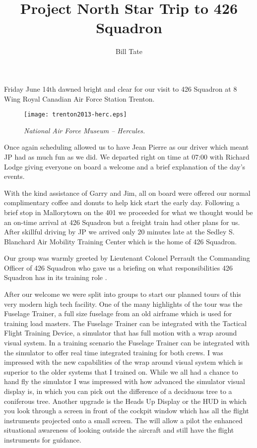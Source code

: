 



\title{Project North Star Trip to  426 Squadron}
\author{Bill Tate}

\maketitle

Friday June 14th dawned bright and clear for our visit to 426 Squadron
at 8 Wing Royal Canadian Air Force Station Trenton.

\begin{figure}[htbp]
   \vspace{2em}
   \centering
   \texttt{[image: trenton2013-herc.eps]}
   \caption*{\small \em National Air Force Museum -- Hercules.}
   \label{fig:herc}
\end{figure}

Once again scheduling allowed us to have Jean Pierre as our driver
which meant JP had as much fun as we did. We departed right on time at
07:00 with Richard Lodge giving everyone on board a welcome and a
brief explanation of the day's events.

With the kind assistance of Garry and Jim, all on board were offered
our normal complimentary coffee and donuts to help kick start the
early day. Following a brief stop in Mallorytown on the 401 we
proceeded for what we thought would be an on-time arrival at 426
Squadron but a freight train had other plans for us. After skillful
driving by JP we arrived only 20 minutes late at the Sedley
S. Blanchard Air Mobility Training Center which is the home of 426
Squadron.

Our group was warmly greeted by Lieutenant Colonel Perrault the
Commanding Officer of 426 Squadron who gave us a briefing on what
responsibilities 426 Squadron has in its training role .

After our welcome we were split into groups to start our planned tours
of this very modern high tech facility. One of the many highlights of
the tour was the Fuselage Trainer, a full size fuselage from an old
airframe which is used for training load masters. The Fuselage Trainer
can be integrated with the Tactical Flight Training Device, a
simulator that has full motion with a wrap around visual system. In a
training scenario the Fuselage Trainer can be integrated with the
simulator to offer real time integrated training for both crews. I was
impressed with the new capabilities of the wrap around visual system
which is superior to the older systems that I trained on. While we all
had a chance to hand fly the simulator I was impressed with how
advanced the simulator visual display is, in which you can pick out
the difference of a deciduous tree to a coniferous tree. Another
upgrade is the Heads Up Display or the HUD in which you look through a
screen in front of the cockpit window which has all the flight
instruments projected onto a small screen. The will allow a pilot the
enhanced situational awareness of looking outside the aircraft and
still have the flight instruments for guidance.

